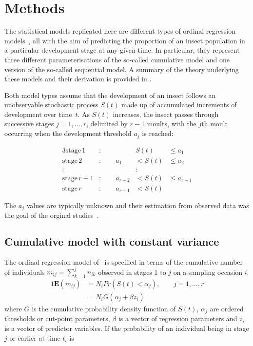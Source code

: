 \section{Methods}
The statistical models replicated here are different types of ordinal regression models~\citep{agresti2010analysis}, all with the aim of predicting the proportion of an insect population in a particular development stage at any given time. 
In particular, they represent three different parameterisations of the so-called cumulative model and one version of the so-called sequential model. 
A summary of the theory underlying these models and their derivation is provided in \citep{burkner2019ordinal}.

Both model types assume that the development of an insect follows an unobservable stochastic process $S(t)$ made up of accumulated increments of development over time~$t$. 
As $S(t)$ increases, the insect passes through successive stages $j=1,\dots,r$, delimited by $r-1$ moults, with the $j$th moult occurring when the development threshold $a_j$ is reached:

\begin{alignat*}{3}
  \mathrm{stage}\,1&:\qquad {}&   S(t) & \leq a_1 \\
  \mathrm{stage}\,2&:\qquad  a_1&< S(t) & \leq a_2 \\
  \vdots & &\vdots \\
  \mathrm{stage}\,r-1&:\qquad  a_{r-2}&< S(t) & \leq a_{r-1} \\
  \mathrm{stage}\,r&:\qquad  a_{r-1}&< S(t) 
\end{alignat*}

The $a_j$ values are typically unknown and their estimation from observed data was the goal of the orginal studies~\citep{dennis1986stochastic,candy1991modeling}.

\subsection{Cumulative model with constant variance }
\label{sec:const_var_cm}
The ordinal regression model of~\citep{candy1991modeling} is specified in terms of the cumulative number of individuals  $m_{ij}=\sum_{k=1}^jn_{ik}$ observed in stages 1 to $j$ on a sampling occasion $i$. 
\begin{alignat}{1}
\mathbf{E}(m_{ij})&=N_iPr(S(t) < \alpha_j), \qquad j = 1,\dots ,r\\
&=N_iG(\alpha_j + \beta z_i)
\end{alignat}
where $G$ is the cumulative probability density function of $S(t)$, $\alpha_j$ are ordered thresholds or cut-point parameters, $\beta$ is a vector of regression parameters and $z_i$ is a vector of predictor variables.
If the probability of an individual being in stage $j$ or earlier at time $t_i$ is 

